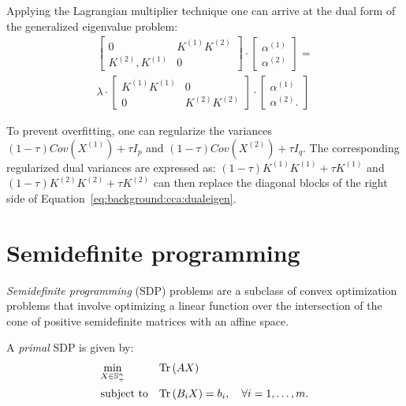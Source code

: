 Applying the Lagrangian multiplier technique one can arrive at the dual form of the generalized eigenvalue
problem:
\begin{align}\label{eq:background:cca:dualeigen}
\begin{bmatrix}
    0               & K^{(1)} K^{(2)} \\
    K^{(2)},K^{(1)} & 0
\end{bmatrix}
\cdot
\begin{bmatrix}
    \alpha^{(1)} \\
    \alpha^{(2)}
\end{bmatrix}
= \\
\lambda
\cdot
\begin{bmatrix}
    K^{(1)} K^{(1)} & 0 \\
    0 &  K^{(2)} K^{(2)}
\end{bmatrix}
\cdot
\begin{bmatrix}
    \alpha^{(1)} \\
    \alpha^{(2)}.
\end{bmatrix}
\end{align}

To prevent overfitting, one can regularize the variances $(1-\tau) Cov(X^{(1)}) + \tau I_p$ and $(1-\tau) Cov(X^({2})) + \tau I_q$.
The corresponding regularized dual variances are expressed as: $(1-\tau) K^{(1)}K^{(1)} + \tau K^{(1)}$ and $(1-\tau) K^{(2)}K^{(2)}+ \tau K^{(2)}$
can then replace the diagonal blocks of the right side of Equation~\ref{eq:background:cca:dualeigen}.


\section{Semidefinite programming}

\emph{Semidefinite programming} (SDP) problems are a subclass of convex optimization problems that involve optimizing a linear function over the intersection
of the cone of positive semidefinite matrices with an affine space.

A \emph{primal} SDP is given by:
\begin{equation}\label{eq:background:sdp:primal}
\begin{aligned}
& \underset{X \in \mathbb{S}_{+}^n}{\text{min}}
& &\mathrm{Tr}\left(A X\right) \\
& \text{subject to}
& &\mathrm{Tr}\left(B_i X\right) = b_i,  \quad\forall i =1,\ldots,m.\\
\end{aligned}
\end{equation}

